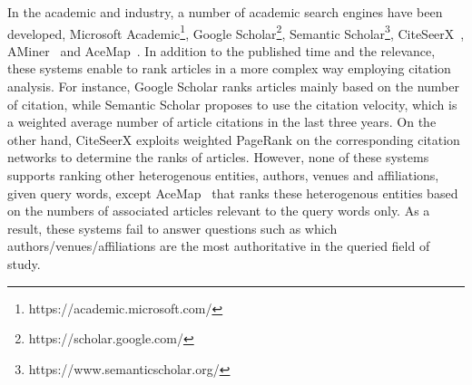 In the academic and industry, a number of academic search engines have been developed, \eg Microsoft Academic\footnote{https://academic.microsoft.com/}, Google Scholar\footnote{https://scholar.google.com/}, Semantic Scholar\footnote{https://www.semanticscholar.org/}, CiteSeerX~\cite{li2006citeseerx}, AMiner~\cite{tang2008arnetminer} and AceMap~\cite{tan2016acemap}.
%
In addition to the published time and the relevance, these systems enable to rank articles in a more complex way employing citation analysis. For instance, Google Scholar ranks articles mainly based on the number of citation, while Semantic Scholar proposes to use the citation velocity, which is a weighted average number of article citations in the last three years. On the other hand, CiteSeerX exploits weighted PageRank on the corresponding citation networks to determine the ranks of articles.
%
However, none of these systems supports ranking other heterogenous entities, \eg authors, venues and affiliations, given query words, except AceMap~\cite{tan2016acemap} that ranks these heterogenous entities based on the numbers of associated articles relevant to the query words only. As a result, these systems fail to answer questions such as which authors/venues/affiliations are the most authoritative in the queried field of study.








